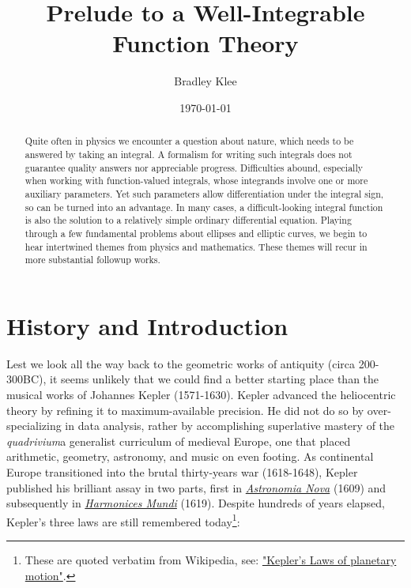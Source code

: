 \documentclass[nofootinbib,preprint]{revtex4-1}
\begin{document}
\title{Prelude to a Well-Integrable Function Theory}
\author{Bradley Klee}

\date{\today}

\begin{abstract}
Quite often in physics we encounter a question about nature, which needs to be answered by taking 
an integral. A formalism for writing such integrals does not guarantee quality answers nor appreciable 
progress. Difficulties abound, especially when working with function-valued integrals, whose integrands 
involve one or more auxiliary parameters. Yet such parameters allow differentiation under the integral 
sign, so can be turned into an advantage. In many cases, a difficult-looking integral function is 
also the solution to a relatively simple ordinary differential equation. Playing through a few 
fundamental problems about ellipses and elliptic curves, we begin to hear intertwined themes 
from physics and mathematics. These themes will recur in more substantial followup works. 
\end{abstract}

\maketitle 

\section{History and Introduction}
Lest we look all the way back to the geometric works of antiquity 
(circa 200-300BC), it seems unlikely that we could find 
a better starting place than the musical works of Johannes Kepler (1571-1630).
Kepler advanced the heliocentric theory by refining it to maximum-available 
precision. He did not do so by over-specializing
in data analysis, rather by accomplishing superlative mastery of the 
\textit{quadrivium}\textemdash a generalist curriculum of medieval Europe, 
one that placed arithmetic, geometry, astronomy, and music on even footing.
As continental Europe transitioned into the brutal thirty-years war (1618-1648), 
Kepler published his brilliant assay in two parts, first 
in \href{https://archive.org/details/Astronomianovaa00Kepl}{\textit{Astronomia Nova}} (1609) 
and subsequently in \href{https://archive.org/details/ioanniskepplerih00kepl/mode/2up}{\textit{Harmonices Mundi}} 
(1619). Despite hundreds of years elapsed, Kepler's three laws are still remembered today\footnote{These
are quoted verbatim from Wikipedia, see:
\href{https://en.wikipedia.org/wiki/Kepler's_laws_of_planetary_motion
}{"Kepler's Laws of planetary motion"}.}:
\end{document}
